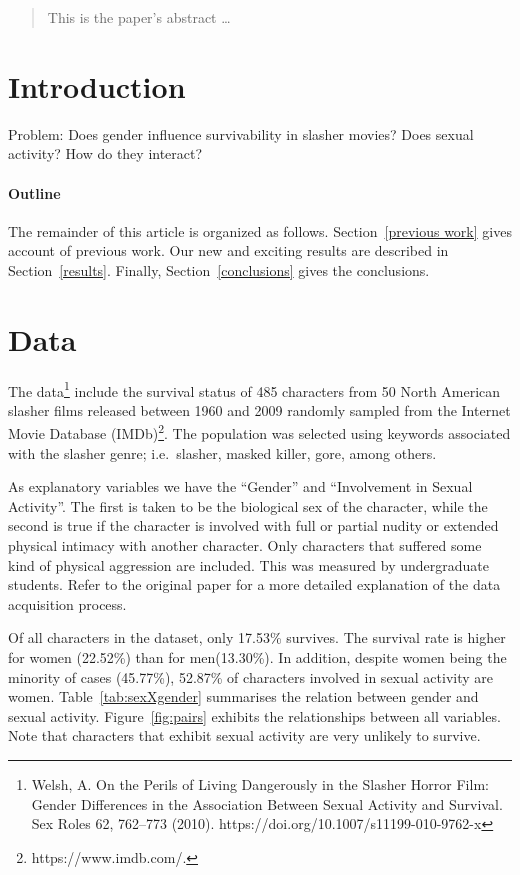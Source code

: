 \documentclass[12pt]{article}
\begin{document}
\maketitle

\begin{abstract}
This is the paper's abstract \ldots
\end{abstract}

\section{Introduction}
Problem: Does gender influence survivability in slasher movies? Does sexual activity? How do they interact?

\paragraph{Outline}
The remainder of this article is organized as follows.
Section~\ref{previous work} gives account of previous work.
Our new and exciting results are described in Section~\ref{results}.
Finally, Section~\ref{conclusions} gives the conclusions.

\section{Data}\label{data}
The data\footnote{Welsh, A. On the Perils of Living Dangerously in the Slasher Horror Film: Gender Differences in the Association Between Sexual Activity and Survival. Sex Roles 62, 762–773 (2010). https://doi.org/10.1007/s11199-010-9762-x} include the survival status of 485 characters from 50 North American slasher films released between 1960 and 2009 randomly sampled from the Internet Movie Database (IMDb)\footnote{https://www.imdb.com/.}. The population was selected using keywords associated with the slasher genre; i.e.\ slasher, masked killer, gore, among others.

As explanatory variables we have the ``Gender'' and ``Involvement in Sexual Activity''. The first is taken to be the biological sex of the character, while the second is true if the character is involved with full or partial nudity or extended physical intimacy with another character. Only characters that suffered some kind of physical aggression are included. This was measured by undergraduate students. Refer to the original paper for a more detailed explanation of the data acquisition process.

Of all characters in the dataset, only 17.53\% survives. The survival rate is higher for women (22.52\%) than for men(13.30\%). In addition, despite women being the minority of cases (45.77\%), 52.87\% of characters involved in sexual activity are women. Table~\ref{tab:sexXgender} summarises the relation between gender and sexual activity. Figure~\ref{fig:pairs} exhibits the relationships between all variables. Note that characters that exhibit sexual activity are very unlikely to survive.
\end{document}
